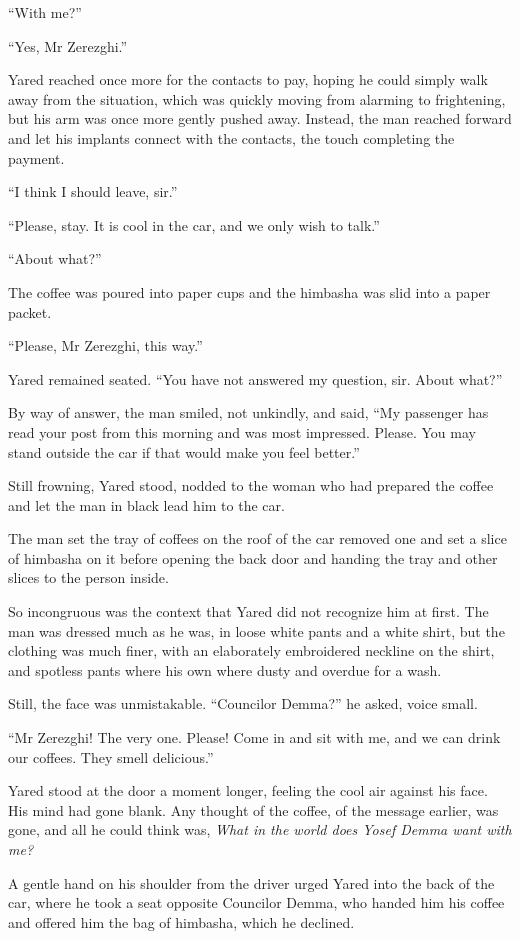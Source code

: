 ``With me?''

``Yes, Mr Zerezghi.''

Yared reached once more for the contacts to pay, hoping he could simply walk away from the situation, which was quickly moving from alarming to frightening, but his arm was once more gently pushed away. Instead, the man reached forward and let his implants connect with the contacts, the touch completing the payment.

``I think I should leave, sir.''

``Please, stay. It is cool in the car, and we only wish to talk.''

``About what?''

The coffee was poured into paper cups and the himbasha was slid into a paper packet.

``Please, Mr Zerezghi, this way.''

Yared remained seated. ``You have not answered my question, sir. About what?''

By way of answer, the man smiled, not unkindly, and said, ``My passenger has read your post from this morning and was most impressed. Please. You may stand outside the car if that would make you feel better.''

Still frowning, Yared stood, nodded to the woman who had prepared the coffee and let the man in black lead him to the car.

The man set the tray of coffees on the roof of the car removed one and set a slice of himbasha on it before opening the back door and handing the tray and other slices to the person inside.

So incongruous was the context that Yared did not recognize him at first. The man was dressed much as he was, in loose white pants and a white shirt, but the clothing was much finer, with an elaborately embroidered neckline on the shirt, and spotless pants where his own where dusty and overdue for a wash.

Still, the face was unmistakable. ``Councilor Demma?'' he asked, voice small.

``Mr Zerezghi! The very one. Please! Come in and sit with me, and we can drink our coffees. They smell delicious.''

Yared stood at the door a moment longer, feeling the cool air against his face. His mind had gone blank. Any thought of the coffee, of the message earlier, was gone, and all he could think was, \emph{What in the world does Yosef Demma want with me?}

A gentle hand on his shoulder from the driver urged Yared into the back of the car, where he took a seat opposite Councilor Demma, who handed him his coffee and offered him the bag of himbasha, which he declined.

